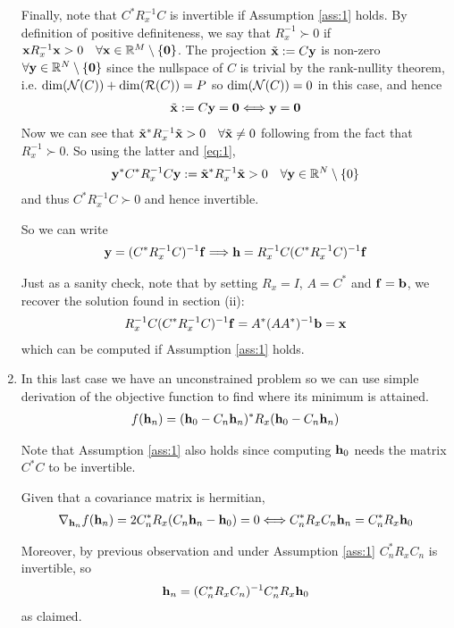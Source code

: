 \documentclass{article}
\begin{document}
\begin{enumerate}[label=(\roman*)]
        Finally, note that $C^* R_x^{-1} C$ is invertible if Assumption \ref{ass:1} holds. By definition of positive definiteness, we say that $R_x^{-1}\succ 0$ if $\mathbf{x} R_x^{-1} \mathbf{x} > 0\quad \forall \mathbf{x} \in \mathbb{R}^M \setminus \{\mathbf{0}\}$. The projection $\tilde{\mathbf{x}} := C \mathbf{y}$ is non-zero $\forall \mathbf{y} \in \mathbb{R}^N \setminus \{\mathbf{0}\}$ since the nullspace of $C$ is trivial by the rank-nullity theorem, i.e. $\dim(\mathcal{N}(C))+ \dim(\mathcal{R}(C))=P$ so $\dim(\mathcal{N}(C))=0$ in this case, and hence
        \begin{align}
        \tilde{\mathbf{x}}  := C \mathbf{y} = \mathbf{0} \Longleftrightarrow \mathbf{y} = \mathbf{0} \label{eq:1}
        \end{align}
        Now we can see that $\tilde{\mathbf{x}}^* R_x^{-1} \tilde{\mathbf{x}} > 0\quad \forall \tilde{\mathbf{x}} \neq 0$ following from the fact that $R_x^{-1} \succ 0$. So using the latter and \eqref{eq:1},
        \begin{align}
        \mathbf{y}^* C^* R_x^{-1} C \mathbf{y}:=\tilde{\mathbf{x}}^* R_x^{-1} \tilde{\mathbf{x}} > 0\quad \forall \mathbf{y} \in \mathbb{R}^N \setminus \{0\}
        \end{align}
        and thus $C^* R_x^{-1} C \succ 0$ and hence invertible.
        
        So we can write
        \begin{align}
            \mathbf{y} = (C^* R_x^{-1} C)^{-1} \mathbf{f} \Longrightarrow \mathbf{h} = R_x^{-1} C (C^* R_x^{-1} C)^{-1} \mathbf{f}
        \end{align}
        
        Just as a sanity check, note that by setting $R_x = I$, $A = C^*$ and $\mathbf{f} = \mathbf{b}$, we recover the solution found in section (ii):
        \begin{align}
            R_x^{-1} C (C^* R_x^{-1} C)^{-1} \mathbf{f} = A^* (A A^*)^{-1} \mathbf{b} = \mathbf{x}
        \end{align}
        which can be computed if Assumption \ref{ass:1} holds.
        
        \item In this last case we have an unconstrained problem so we can use simple derivation of the objective function to find where its minimum is attained.
        \begin{align}
            f(\mathbf{h}_n) = (\mathbf{h}_0 - C_n \mathbf{h}_n )^* R_x (\mathbf{h}_0 - C_n \mathbf{h}_n )
        \end{align}
        
        Note that Assumption \ref{ass:1} also holds since computing $\mathbf{h}_0$ needs the matrix $C^* C$ to be invertible.
        
        Given that a covariance matrix is hermitian,
        \begin{align}
            \nabla_{\mathbf{h}_n} f(\mathbf{h}_n) = 2 C_n^* R_x (C_n \mathbf{h}_n - \mathbf{h}_0) = 0 \Longleftrightarrow C_n^* R_x C_n \mathbf{h}_n =  C_n^* R_x \mathbf{h}_0
        \end{align}
        
        Moreover, by previous observation and under Assumption \ref{ass:1} $C_n^* R_x C_n$ is invertible, so
        \begin{align}
            \mathbf{h}_n = (C_n^* R_x C_n)^{-1} C_n^* R_x \mathbf{h}_0
        \end{align}
        as claimed.
    \end{enumerate}
\end{document}
